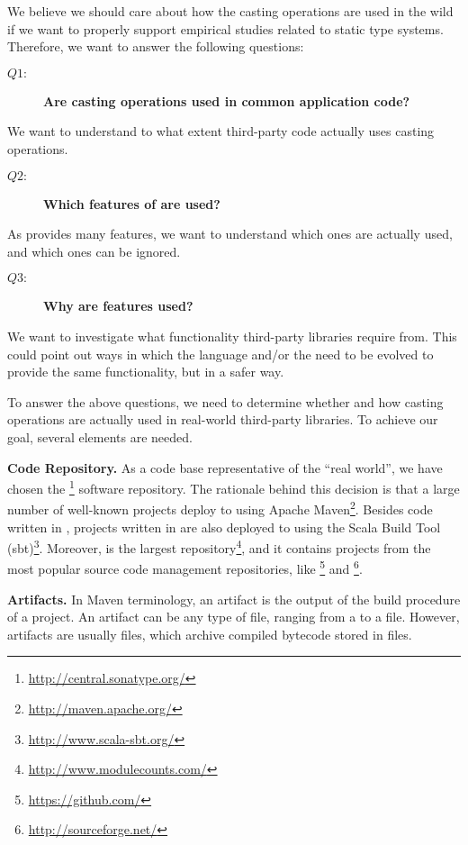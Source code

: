 \documentclass{usiinfdocprop}
\begin{document}
We believe we should care about how the casting operations are used in the wild if we want to properly support empirical studies related to static type systems. 
Therefore, we want to answer the following questions: 

\begin{description}
\item[{\(Q1:\)}] \textbf{Are casting operations used in common application code?}
\end{description}
We want to understand to what extent third-party code actually uses casting operations. 

\begin{description}
\item[{\(Q2:\)}] \textbf{Which features of  are used?}
\end{description}
As provides many features, we want to understand which ones are actually used, and which ones can be ignored. 

\begin{description}
\item[{\(Q3:\)}] \textbf{Why are features used?}
\end{description}
We want to investigate what functionality third-party libraries require from. 
This could point out ways in which the \java{} language and/or the \jvm{} need to be evolved to provide the same functionality, but in a safer way.   

To answer the above questions, we need to determine whether and how casting operations are actually used in real-world third-party \java{} libraries. 
To achieve our goal, several elements are needed. 

\textbf{Code Repository.} 
As a code base representative of the ``real world'', we have chosen the \mavencentral \footnote{\url{http://central.sonatype.org/}} software repository. 
The rationale behind this decision is that a large number of well-known \java{} projects deploy to \mavencentral{} using Apache Maven\footnote{\url{http://maven.apache.org/}}. 
Besides code written in \java{}, projects written in \scala{} are also deployed to \mavencentral{} using the Scala Build Tool (sbt)\footnote{\url{http://www.scala-sbt.org/}}. 
Moreover, \mavencentral{} is the largest \java{} repository\footnote{\url{http://www.modulecounts.com/}}, and it contains projects from the most popular source code management repositories, like \github \footnote{\url{https://github.com/}} and \sourceforge \footnote{\url{http://sourceforge.net/}}. 

\textbf{Artifacts.} 
In Maven terminology, an artifact is the output of the build procedure of a project. 
An artifact can be any type of file, ranging from a  to a  file. 
However, artifacts are usually  files, which archive compiled \java{} bytecode stored in  files. 
\end{document}
